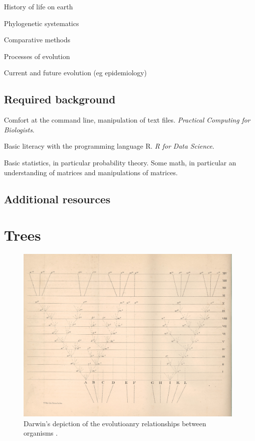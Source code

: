 \documentclass[
]{book}
\begin{document}
History of life on earth

Phylogenetic systematics

Comparative methods

Processes of evolution

Current and future evolution (eg epidemiology)

\hypertarget{required-background}{%
\section{Required background}\label{required-background}}

Comfort at the command line, manipulation of text files. \emph{Practical Computing for Biologists}.

Basic literacy with the programming language R. \emph{R for Data Science}.

Basic statistics, in particular probability theory. Some math, in particular an understanding of matrices and manipulations of matrices.

\hypertarget{additional-resources}{%
\section{Additional resources}\label{additional-resources}}

\hypertarget{trees}{%
\chapter{Trees}\label{trees}}

\begin{figure}
\centering
\includegraphics{figures/darwin.png}
\caption{\label{fig:trees-darwin}Darwin's depiction of the evolutioanry relationships between organisms \citep{darwin1859}.}
\end{figure}
\end{document}
